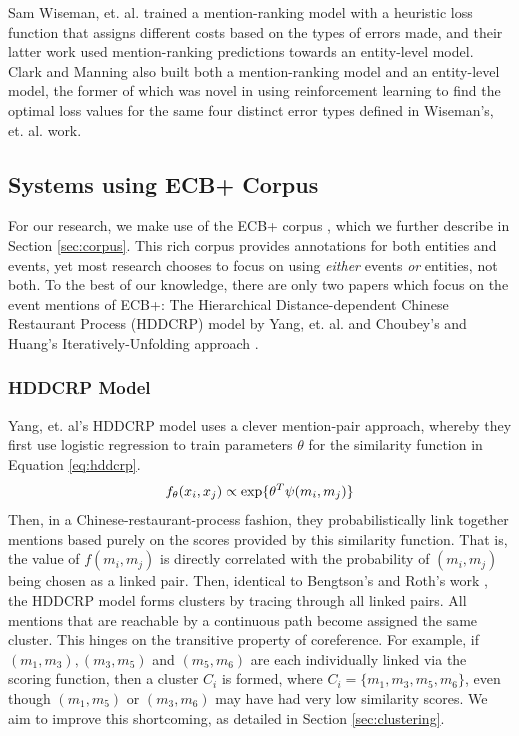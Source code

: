 \documentclass[11pt,a4paper]{article}
\begin{document}
Sam Wiseman, et. al.  trained a mention-ranking model with a heuristic loss function that assigns different costs based on the types of errors made, and their latter work used mention-ranking predictions towards an entity-level model.
Clark and Manning  also built both a mention-ranking model and an entity-level model, the former of which was novel in using reinforcement learning to find the optimal loss values for the same four distinct error types defined in Wiseman's, et. al.  work.

\subsection{Systems using ECB+ Corpus}
For our research, we make use of the ECB+ corpus \cite{ECB+}, which we further describe in Section \ref{sec:corpus}.  This rich corpus provides annotations for both entities and events, yet most research chooses to focus on using \textit{either} events \textit{or} entities, not both.  To the best of our knowledge, there are only two papers which focus on the event mentions of ECB+: The Hierarchical Distance-dependent Chinese Restaurant Process (HDDCRP) model by Yang, et. al.  and Choubey's and Huang's Iteratively-Unfolding approach .

\subsubsection{HDDCRP Model}
\label{sec:HDDCRP}
Yang, et. al's HDDCRP model  uses a clever mention-pair approach, whereby they first use logistic regression to train parameters $\theta$ for the similarity function in Equation \ref{eq:hddcrp}.  
\begin{equation}
\label{eq:hddcrp}
f_{\theta}(x_i,x_j) \propto \textnormal{exp\{} \theta^T\psi(m_i,m_j)\textnormal{\}}
\end{equation}
Then, in a Chinese-restaurant-process fashion, they probabilistically link together mentions based purely on the scores provided by this similarity function.  That is, the value of $f(m_i,m_j)$ is directly correlated with the probability of $(m_i,m_j)$ being chosen as a linked pair.  Then, identical to Bengtson's and Roth's work , the HDDCRP model forms clusters by tracing through all linked pairs. All mentions that are reachable by a continuous path become assigned the same cluster.  This hinges on the transitive property of coreference.  For example, if ${(m_1,m_3),(m_3,m_5)}$ and $(m_5,m_6)$ are each individually linked via the scoring function, then a cluster $C_i$ is formed, where $C_i = \{m_1,m_3,m_5,m_6\}$, even though $(m_1,m_5)$ or $(m_3,m_6)$ may have had very low similarity scores. We aim to improve this shortcoming, as detailed in Section \ref{sec:clustering}.
\end{document}
